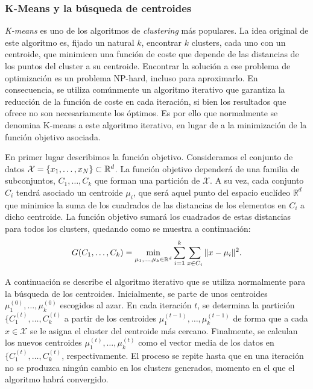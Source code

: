 \subsubsection{K-Means y la búsqueda de centroides}

\emph{K-means} es uno de los algoritmos de \emph{clustering} más populares. La idea original de este algoritmo es, fijado un natural $k$, encontrar $k$ clusters, cada uno con un centroide, que minimicen una función de coste que depende de las distancias de los puntos del cluster a su centroide. Encontrar la solución a ese problema de optimización es un problema NP-hard, incluso para aproximarlo. En consecuencia, se utiliza comúnmente un algoritmo iterativo que garantiza la reducción de la función de coste en cada iteración, si bien los resultados que ofrece no son necesariamente los óptimos. Es por ello que normalmente se denomina K-means a este algoritmo iterativo, en lugar de a la minimización de la función objetivo asociada.

En primer lugar describimos la función objetivo. Consideramos el conjunto de datos $\mathcal{X} = \{x_1,\dots,x_N\} \subset \mathbb{R}^d$. La función objetivo dependerá de una familia de subconjuntos, $C_1,\dots,C_k$ que forman una partición de $\mathcal{X}$. A su vez, cada conjunto $C_i$ tendrá asociado un centroide $\mu_i$, que será aquel punto del espacio euclídeo $\mathbb{R}^d$ que minimice la suma de los cuadrados de las distancias de los elementos en $C_i$ a dicho centroide.  La función objetivo sumará los cuadrados de estas distancias para todos los clusters, quedando como se muestra a continuación:
\begin{equation} \label{eq:obj:kmeans}
    G(C_1,\dots,C_k) = \min_{\mu_1,\dots,\mu_k \in \mathbb{R}^d} \sum_{i=1}^{k}\sum_{x\in C_i} \|x-\mu_i\|^2.
\end{equation}

A continuación se describe el algoritmo iterativo que se utiliza normalmente para la búsqueda de los centroides. Inicialmente, se parte de unos centroides $\mu_1^{(0)},\dots,\mu_k^{(0)}$ escogidos al azar. En cada iteración $t$, se determina la partición $\{C_1^{(t)},\dots,C_k^{(t)}$ a partir de los centroides $\mu_1^{(t-1)},\dots,\mu_k^{(t-1)}$ de forma que a cada $x \in \mathcal{X}$ se le asigna el cluster del centroide más cercano. Finalmente, se calculan los nuevos centroides $\mu_1^{(t)},\dots,\mu_k^{(t)}$ como el vector media de los datos en $\{C_1^{(t)},\dots,C_k^{(t)}$, respectivamente. El proceso se repite hasta que en una iteración no se produzca ningún cambio en los clusters generados, momento en el que el algoritmo habrá convergido.

